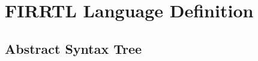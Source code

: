 \documentclass[12pt]{article}
\begin{document}
\maketitle

\newcommand{\id}{\text{id }}
\newcommand{\ids}{\text{id}}
\newcommand{\ints}{\text{int}}
\newcommand{\kw}[1]{\text{\bf #1\ }}
\newcommand{\kws}[1]{\text{\bf #1}}
\newcommand{\pd}[1]{\text{\em #1\ }}
\newcommand{\pds}[1]{\text{\em #1}}
\newcommand{\bundleT}[1]{\{#1\}}
\newcommand{\info}{[\pds{info}]\ }

\section{FIRRTL Language Definition}

\subsection{Abstract Syntax Tree}
\end{document}
